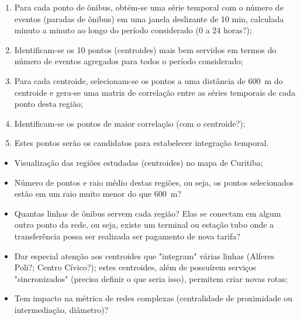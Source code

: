 

\begin{enumerate}
    \item Para cada ponto de ônibus, obtém-se uma série temporal com o número de eventos (paradas de ônibus) em uma janela deslizante de 10 min, calculada minuto a minuto ao longo do período considerado (0 a 24 horas?);
    \item Identificam-se os 10 pontos (centroides) mais bem servidos em termos do número de eventos agregados para todos o período considerado;
    \item Para cada centroide, selecionam-se os pontos a uma distância de 600~m do centroide e gera-se uma matriz de correlação entre as séries temporais de cada ponto desta região;
    \item Identificam-se os pontos de maior correlação (com o centroide?);
    \item Estes pontos serão os candidatos para estabelecer integração temporal.
\end{enumerate}


\begin{itemize}
    \item Visualização das regiões estudadas (centroides) no mapa de Curitiba;
    \item Número de pontos e raio médio destas regiões, ou seja, os pontos selecionados estão em um raio muito menor do que 600~m?
    \item Quantas linhas de ônibus servem cada região? Elas se conectam em algum outro ponto da rede, ou seja, existe um terminal ou estação tubo onde a transferência possa ser realizada ser pagamento de nova tarifa?
    \item Dar especial atenção aos centroides que "integram" várias linhas (Alferes Poli?; Centro Cívico?); estes centroides, além de possuírem serviços "sincronizados" (precisa definir o que seria isso), permitem criar novas rotas;
\end{itemize}


\begin{itemize}
    \item Tem impacto na métrica de redes complexas (centralidade de proximidade ou intermediação, diâmetro)?
\end{itemize}